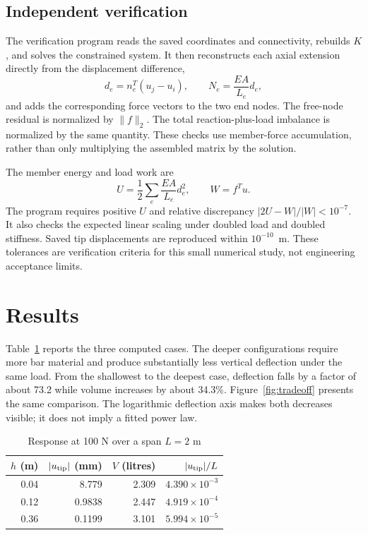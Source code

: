 \documentclass[conference]{IEEEtran}
\begin{document}
\subsection{Independent verification}
The verification program reads the saved coordinates and connectivity, rebuilds $K$, and solves the constrained system. It then reconstructs each axial extension directly from the displacement difference,
\begin{equation}
 d_e=n_e^T(u_j-u_i),\qquad N_e=\frac{EA}{L_e}d_e,
 \label{eq:force}
\end{equation}
and adds the corresponding force vectors to the two end nodes. The free-node residual is normalized by $\|f\|_2$. The total reaction-plus-load imbalance is normalized by the same quantity. These checks use member-force accumulation, rather than only multiplying the assembled matrix by the solution.

The member energy and load work are
\begin{equation}
 U=\frac12\sum_e\frac{EA}{L_e}d_e^2,
 \qquad W=f^Tu.
 \label{eq:energy}
\end{equation}
The program requires positive $U$ and relative discrepancy $|2U-W|/|W|<10^{-7}$. It also checks the expected linear scaling under doubled load and doubled stiffness. Saved tip displacements are reproduced within $10^{-10}$~m. These tolerances are verification criteria for this small numerical study, not engineering acceptance limits.

\section{Results}
Table~\ref{tab:results} reports the three computed cases. The deeper configurations require more bar material and produce substantially less vertical deflection under the same load. From the shallowest to the deepest case, deflection falls by a factor of about 73.2 while volume increases by about 34.3\%. Figure~\ref{fig:tradeoff} presents the same comparison. The logarithmic deflection axis makes both decreases visible; it does not imply a fitted power law.

\begin{table}[t]
\caption{Response at 100 N over a span $L=2$ m}
\label{tab:results}
\centering
\begin{tabular}{rrrr}
\toprule
$h$ (m)&$|u_{\rm tip}|$ (mm)&$V$ (litres)&$|u_{\rm tip}|/L$\\
\midrule
0.04&8.779&2.309&$4.390\times10^{-3}$\\
0.12&0.9838&2.447&$4.919\times10^{-4}$\\
0.36&0.1199&3.101&$5.994\times10^{-5}$\\
\bottomrule
\end{tabular}
\end{table}
\end{document}
